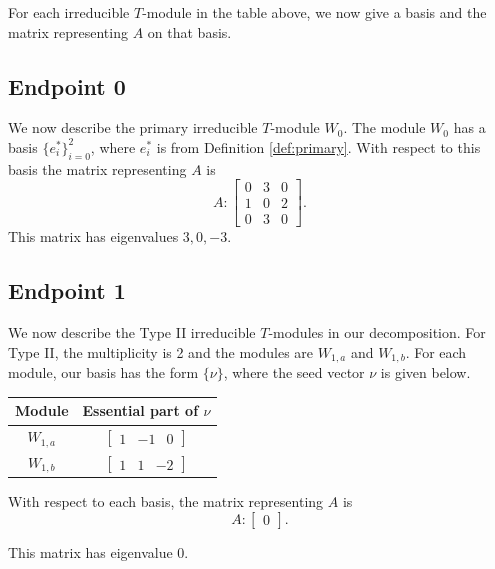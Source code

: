 \documentclass[12pt,letterpaper]{article}
\newcommand{\rowvector}[1]{\begin{bmatrix} #1 \end{bmatrix}}
\begin{document}
For each irreducible $T$-module in the table above, we now give a basis and the matrix representing $A$ on that basis. 

\subsection{Endpoint 0}

We now describe the primary irreducible $T$-module $W_0$. The module $W_0$ has a basis $\{e_i^*\}_{i=0}^2$, where $e_i^*$ is from Definition \ref{def:primary}. With respect to this basis the matrix representing $A$ is
\begin{equation}
    A: \begin{bmatrix}
  0 & 3 & 0 \\
  1 & 0 & 2 \\
  0 & 3 & 0
\end{bmatrix}.\label{eq:k33-I}
\end{equation}
This matrix has eigenvalues $3, 0, -3$.

\subsection{Endpoint 1}

We now describe the Type II irreducible $T$-modules in our decomposition. For Type II, the multiplicity is 2 and the modules are $W_{1,a}$ and $W_{1,b}$. For each module, our basis has the form $\{\nu\}$, where the seed vector $\nu$ is given below.
\begin{center}
    \begin{tabular}{c | c}
    \toprule
       \textbf{Module}  & \textbf {Essential part of }$\nu$ \\
       \midrule
       $W_{1,a}$  & $\rowvector{1 & -1 & 0}$ \\[1.67pt]
       $W_{1,b}$  & $\rowvector{1 & 1 & -2}$ \\
    \bottomrule
    \end{tabular}
\end{center}

With respect to each basis, the matrix representing $A$ is 
\begin{equation}
A: \begin{bmatrix}
  0
\end{bmatrix}.
\label{eq:k33-II}
\end{equation}

This matrix has eigenvalue $0$.
\end{document}
